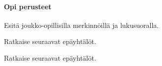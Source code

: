 \begin{tehtavasivu}

\paragraph*{Opi perusteet}

\begin{tehtava}
    Esitä joukko-opillisilla merkinnöillä ja lukusuoralla.
    \begin{alakohdat}
    \end{alakohdat}
    \begin{vastaus}
        \begin{alakohdat}
        \end{alakohdat}
    \end{vastaus}
\end{tehtava}

\begin{tehtava}
    Ratkaise seuraavat epäyhtälöt.
    \begin{alakohdat}
    \end{alakohdat}
    \begin{vastaus}
        \begin{alakohdat}
        \end{alakohdat}
    \end{vastaus}
\end{tehtava}

\begin{tehtava}
    Ratkaise seuraavat epäyhtälöt.
    \begin{alakohdat}
    \end{alakohdat}
    \begin{vastaus}
        \begin{alakohdat}
        \end{alakohdat}
    \end{vastaus}
\end{tehtava}


\end{tehtavasivu}
